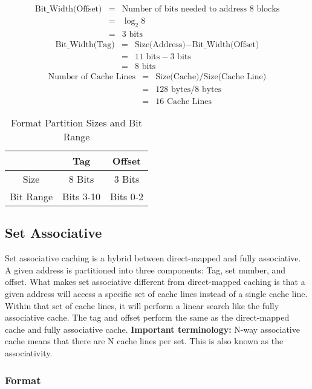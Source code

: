 \documentclass[11pt]{article}
\begin{document}
\begin{eqnarray*}
	\text{Bit\_Width(Offset)} &=& \text{Number of bits needed to address 8 blocks}\\
	&=& \log_2 8\\
	&=& 3 \text{ bits}
\end{eqnarray*}
\begin{eqnarray*}
	\text{Bit\_Width(Tag)} &=& \text{Size(Address)} - \text{Bit\_Width(Offset)}\\
	&=& 11 \text{ bits} - 3 \text{ bits}\\
	&=& 8 \text{ bits}
\end{eqnarray*}
\begin{eqnarray*}
	\text{Number of Cache Lines} &=& \text{Size(Cache)} / \text{Size(Cache Line)}\\
	&=& 128 \text{ bytes} / 8 \text{ bytes}\\
	&=& 16 \text{ Cache Lines}
\end{eqnarray*}

\begin{table}[H]
	\centering
	\caption*{Format Partition Sizes and Bit Range}
	\begin{tabular}{| c | c | c |}
		\hline
		&	Tag		&	Offset\\
		\hline
		Size		&	8 Bits		&	3 Bits\\
		\hline
		Bit Range	&	Bits 3-10	&	Bits 0-2\\
		\hline
	\end{tabular}
\end{table}

\subsection{Set Associative}

Set associative caching is a hybrid between direct-mapped and fully associative. A given address is partitioned into three components: Tag, set number, and offset. What makes set associative different from direct-mapped caching is that a given address will access a specific set of cache lines instead of a single cache line. Within that set of cache lines, it will perform a linear search like the fully associative cache. The tag and offset perform the same as the direct-mapped cache and fully associative cache. \textbf{Important terminology:} N-way associative cache means that there are N cache lines per set. This is also known as the associativity.

\subsubsection{Format}
\end{document}
